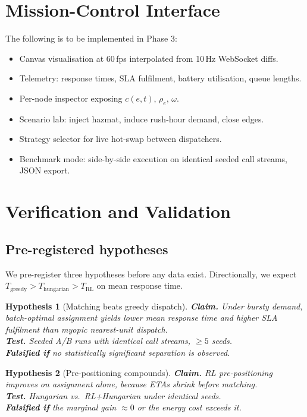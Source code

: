 \documentclass[11pt,a4paper]{article}
\theoremstyle{spaceddef}
\theoremstyle{spacedplain}
\newtheorem{hypothesis}{Hypothesis}[section]
\begin{document}
\section{Mission-Control Interface}\label{sec:hmi}
The following is to be implemented in Phase 3:
\begin{itemize}[leftmargin=1.6em,itemsep=2pt]
  \item Canvas visualisation at 60\,fps interpolated from 10\,Hz WebSocket diffs.
  \item Telemetry: response times, SLA fulfilment, battery utilisation, queue lengths.
  \item Per-node inspector exposing $c(e,t)$, $\rho_e$, $\omega$.
  \item Scenario lab: inject hazmat, induce rush-hour demand, close edges.
  \item Strategy selector for live hot-swap between dispatchers.
  \item Benchmark mode: side-by-side execution on identical seeded call streams, JSON export.
\end{itemize}

\section{Verification and Validation}\label{sec:vv}

\subsection{Pre-registered hypotheses}\label{sec:hyp}
We pre-register three hypotheses before any data exist. Directionally, we expect
$T_{\mathrm{greedy}} > T_{\mathrm{hungarian}} > T_{\mathrm{RL}}$ on mean response
time.

\begin{hypothesis}[Matching beats greedy dispatch]\label{hyp:1}
\textbf{Claim.} Under bursty demand, batch-optimal assignment yields lower mean
response time and higher SLA fulfilment than myopic nearest-unit dispatch.\\
\textbf{Test.} Seeded A/B runs with identical call streams, $\ge5$ seeds.\\
\textbf{Falsified if} no statistically significant separation is observed.
\end{hypothesis}

\begin{hypothesis}[Pre-positioning compounds]\label{hyp:2}
\textbf{Claim.} RL pre-positioning improves on assignment alone, because ETAs shrink
before matching.\\
\textbf{Test.} Hungarian vs.\ RL+Hungarian under identical seeds.\\
\textbf{Falsified if} the marginal gain $\approx0$ or the energy cost exceeds it.
\end{hypothesis}
\end{document}
